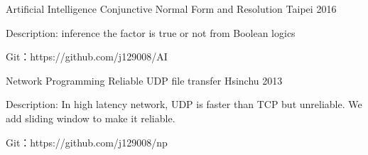 
\begin{cventries}

  \cventry
    {Artificial Intelligence}
    {Conjunctive Normal Form and Resolution}
    {Taipei} %
    {2016} %
    {
      \begin{cvitems} %
        \item {Description: inference the factor is true or not from Boolean logics}
        \item {Git：https://github.com/j129008/AI}
      \end{cvitems}
    }


  \cventry
    {Network Programming}
    {Reliable UDP file transfer}
    {Hsinchu} %
    {2013} %
    {
      \begin{cvitems} %
        \item {Description: In high latency network, UDP is faster than TCP but unreliable. We add sliding window to make it reliable.}
        \item {Git：https://github.com/j129008/np}
      \end{cvitems}
    }

\end{cventries}
